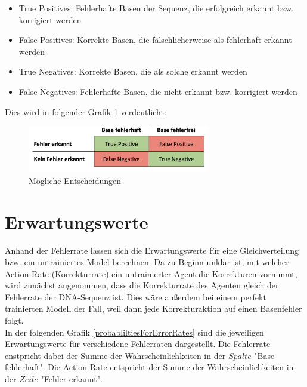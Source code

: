 \documentclass[oneside,bibliography=totocnumbered,BCOR=5mm]{scrbook}%
\theoremstyle{definition}
\theoremstyle{definition}
\theoremstyle{definition}
\theoremstyle{definition}
\theoremstyle{definition}
\theoremstyle{definition}
\begin{document}
\begin{itemize}
  \item True Positives: Fehlerhafte Basen der Sequenz, die erfolgreich erkannt bzw. korrigiert werden
  \item False Positives: Korrekte Basen, die fälschlicherweise als fehlerhaft erkannt werden
  \item True Negatives: Korrekte Basen, die als solche erkannt werden
  \item False Negatives: Fehlerhafte Basen, die nicht erkannt bzw. korrigiert werden
\end{itemize}
Dies wird in folgender Grafik \ref{TPFN} verdeutlicht:

\begin{figure}[h]
  \centering
  \includegraphics[width=300px,keepaspectratio]{images/TP_FN.png}
  \caption{Mögliche Entscheidungen}
  \label{TPFN}
  \end{figure}
%


\section{Erwartungswerte}

Anhand der Fehlerrate lassen sich die Erwartungswerte für eine Gleichverteilung
bzw. ein untrainiertes Model berechnen. Da zu Beginn unklar ist, 
mit welcher Action-Rate (Korrekturrate) ein untrainierter Agent die Korrekturen vornimmt,
wird zunächst angenommen, dass die Korrekturrate des Agenten gleich der Fehlerrate der DNA-Sequenz ist. 
Dies wäre außerdem bei einem perfekt trainierten Modell der Fall, weil 
dann jede Korrekturaktion auf einen Basenfehler folgt.\\

In der folgenden Grafik \ref{probabliltiesForErrorRates} sind die jeweiligen Erwartungswerte für verschiedene Fehlerraten
dargestellt. Die Fehlerrate enstpricht dabei der Summe der Wahrscheinlichkeiten in der
\(Spalte\) "Base fehlerhaft". Die Action-Rate entspricht der Summe der Wahrscheinlichkeiten
in der \(Zeile\) "Fehler erkannt".\\
\end{document}
